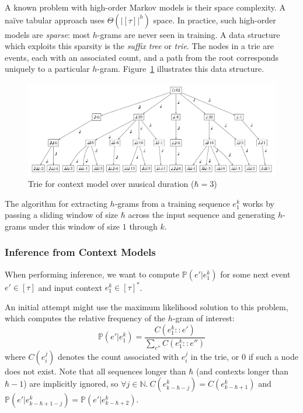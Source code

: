 \documentclass[12pt,a4paper,twoside,openright]{report}
\begin{document}
A known problem with high-order Markov models is their space complexity. A naïve
tabular approach uses $\Theta(|[\tau]|^h)$ space.  In practice, such high-order
models are \emph{sparse}: most $h$-grams are never seen in training. A data
structure which exploits this sparsity is the \emph{suffix tree} or \emph{trie}.
The nodes in a trie are events, each with an associated count, and a path from
the root corresponds uniquely to a particular $h$-gram.
Figure~\ref{fig:dur-trie} illustrates this data structure.

\begin{figure}[H]
\centering
\includegraphics[width=\linewidth]{figs/duration_vp.pdf}
\caption{Trie for context model over musical duration ($\hbar = 3$)}
\label{fig:dur-trie}
\end{figure}

The algorithm for extracting $h$-grams from a training sequence $e_1^k$ works by
passing a sliding window of size $\hbar$ across the input sequence and
generating $h$-grams under this window of size $1$ through $k$. 

\subsubsection{Inference from Context Models}

When performing inference, we want to compute $\mathbb{P}(e' | e_1^k)$ for some
next event $e' \in [\tau]$ and input context $e_1^k \in [\tau]^*$.

An initial attempt might use the maximum likelihood solution to this problem,
which computes the relative frequency of the $h$-gram of interest:
\begin{equation}
  \mathbb{P}(e'|e_1^k) = \frac{ C(e_1^k::e') }{ \sum_{e''} C(e_1^k::e'') }
  \label{eq:ctx-max-like}
\end{equation}
where $C(e_i^j)$ denotes the count associated with $e_i^j$ in the trie, or $0$
if such a node does not exist. Note that all sequences longer than $\hbar$ (and
contexts longer than $\hbar-1$) are implicitly ignored, so $\forall j \in
\mathbb{N}.\ C(e_{k-\hbar-j}^k) = C(e_{k-\hbar+1}^k)$ and
$\mathbb{P}(e'|e_{k-\hbar+1-j}^k) = \mathbb{P}(e'|e_{k-\hbar+2}^k)$.
\end{document}
